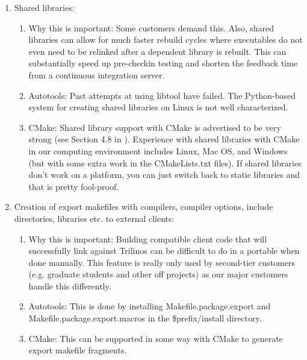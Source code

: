 \documentclass[pdf,ps2pdf,11pt]{SANDreport}
\begin{document}
\begin{enumerate}

{}\item Shared libraries:

  \begin{enumerate}

  {}\item Why this is important: Some customers demand this.  Also,
  shared libraries can allow for much faster rebuild cycles where
  executables do not even need to be relinked after a dependent
  library is rebuilt.  This can substantially speed up pre-checkin
  testing and shorten the feedback time from a continuous
  integration server.

  {}\item Autotools: Past attempts at using libtool have failed.
  The Python-based system for creating shared libraries on Linux is
  not well characterized.

  {}\item CMake: Shared library support with CMake is advertised to
  be very strong (see Section 4.8 in
  {}\cite{MasteringCMake_fourth}).  Experience with shared libraries
  with CMake in our computing environment includes Linux, Mac OS,
  and Windows (but with some extra work in the CMakeLists.txt
  files).  If shared libraries don't work on a platform, you can
  just switch back to static libraries and that is pretty
  fool-proof.

  \end{enumerate}

{}\item Creation of export makefiles with compilers, compiler
options, include directories, libraries etc. to external clients:

  \begin{enumerate}

  {}\item Why this is important: Building compatible client code
  that will successfully link against Trilinos can be difficult to
  do in a portable when done manually.  This feature is really only used
  by second-tier customers (e.g. graduate students and other off
  projects) as our major customers handle this differently.

  {}\item Autotools: This is done by installing
  Makefile.package.export and Makefile.package.export.macros in the
  \$prefix/install directory.

  {}\item CMake: This can be supported in some way with CMake to
  generate export makefile fragments.


\end{enumerate}
\end{enumerate}
\end{document}
